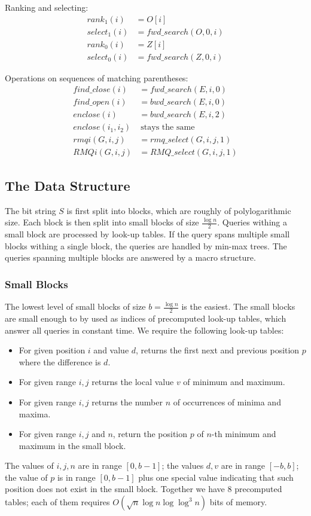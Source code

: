 Ranking and selecting:
\begin{align*}
	rank_1(i) &= O[i] \\
	select_1(i) &= fwd\_search(O, 0, i) \\
	rank_0(i) &= Z[i] \\
	select_0(i) &= fwd\_search(Z, 0, i)
\end{align*}

Operations on sequences of matching parentheses:
\begin{align*}
	find\_close(i) &= fwd\_search(E, i, 0) \\
	find\_open(i) &= bwd\_search(E, i, 0) \\
	enclose(i) &= bwd\_search(E, i, 2) \\
	enclose(i_1, i_2)&\ \textrm{stays the same} \\
	rmqi(G, i, j) &= rmq\_select(G, i, j, 1) \\
	RMQi(G, i, j) &= RMQ\_select(G, i, j, 1)
\end{align*}


\subsection{The Data Structure}

The bit string $S$ is first split into blocks, which are roughly of polylogarithmic size.
Each block is then split into small blocks of size $\frac{\log n}{2}$.
Queries withing a small block are processed by look-up tables.
If the query spans multiple small blocks withing a single block, the queries are handled by min-max trees.
The queries spanning multiple blocks are answered by a macro structure.

\subsubsection{Small Blocks}

The lowest level of small blocks of size $b = \frac{\log n}{2}$ is the easiest.
The small blocks are small enough to by used as indices of precomputed look-up tables, which answer all queries in constant time.
We require the following look-up tables:
\begin{itemize}
	\item For given position $i$ and value $d$, returns the first next and previous position $p$ where the difference is $d$.
	\item For given range $i, j$ returns the local value $v$ of minimum and maximum.
	\item For given range $i, j$ returns the number $n$ of occurrences of minima and maxima.
	\item For given range $i, j$ and $n$, return the position $p$ of $n$-th minimum and maximum in the small block.
\end{itemize}
The values of $i, j, n$ are in range $[0, b - 1]$; the values $d, v$ are in range $[-b, b]$; the value of $p$ is in range $[0, b - 1]$ plus one special value indicating that such position does not exist in the small block.
Together we have 8 precomputed tables; each of them requires $O(\sqrt{n} \log n \log \log^3 n)$ bits of memory.

